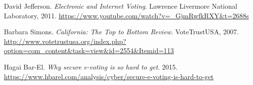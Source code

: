\documentclass[polish]{kbk}
\begin{document}
\begin{thebibliography}{9}
  David Jefferson.
  \emph{Electronic and Internet Voting}.
  Lawrence Livermore National Laboratory, 2011.
  \url{https://www.youtube.com/watch?v=_GjmRwfkRXY&t=2688s}
  
  Barbara Simons.
  \emph{California: The Top to Bottom Review}.
  VoteTrustUSA, 2007.
  \url{http://www.votetrustusa.org/index.php?option=com_content&task=view&id=2554&Itemid=113}
  
  Hagai Bar-El.
  \emph{Why secure e-voting is so hard to get}.
  2015.
  \url{https://www.hbarel.com/analysis/cyber/secure-e-voting-is-hard-to-get}
  
\end{thebibliography}
\end{document}
